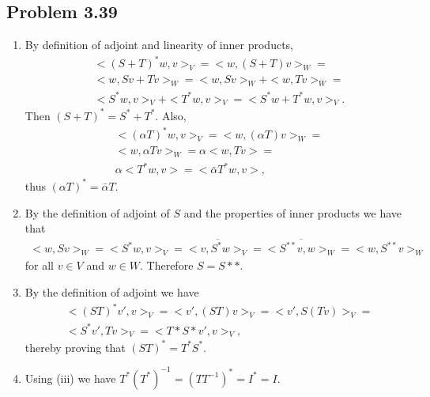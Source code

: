 \documentclass[letterpaper,12pt]{article}
\theoremstyle{definition}
\begin{document}
\begin{spacing}{1.3}{}
\subsection*{Problem 3.39}
\begin{enumerate}
    \item
    	By definition of adjoint and linearity of inner products,
	\begin{align*}
	&<(S+T)^*w,v>_V=
	<w,(S+T)v>_W=\\
	&<w,Sv+Tv>_W=
	<w,Sv>_W+<w,Tv>_W=\\
	&<S^*w,v>_V + <T^*w,v>_V=
	<S^*w+T^*w,v>_V.
	\end{align*}
	Then $(S+T)^*=S^*+T^*$.
	Also,
	\begin{align*}
	&<(\alpha T)^*w,v>_V=
	<w,(\alpha T)v>_W=\\
	&<w,\alpha Tv>_W=
	\alpha<w, Tv>=\\
	&\alpha<T^*w,v>=
	<\bar{\alpha}T^*w,v>,
	\end{align*}
	thus $(\alpha T)^*=\bar{\alpha}T$. \\
	\item
	By the definition of adjoint of $S$ and the properties of inner products we have that
	\begin{align*}
	<w,Sv>_W=<S^*w,v>_V=
	\overline{<v,S^*w>_V}=\overline{<S^{**}v,w>_W}=
	<w,S^{**}v>_W
	\end{align*}
	for all $v\in V$ and $w\in W$.
	Therefore $S=S**$. \\
	\item
	By the definition of adjoint we have
	\begin{align*}
	&<(ST)^*v',v>_V=<v',(ST)v>_V=<v',S(Tv)>_V=\\
	&<S^*v',Tv>_V=<T*S*v',v>_V,
	\end{align*}
	thereby proving that $(ST)^*=T^*S^*$.
	\item
		Using (iii) we have $T^*(T^*)^{-1}=(TT^{-1})^*=I^*=I$. \\
\end{enumerate}



\end{spacing}
\end{document}
